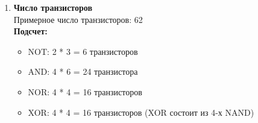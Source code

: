 \documentclass[12pt, a4paper]{article}
\begin{document}
\begin{enumerate}[label=\arabic*., leftmargin=*, widest=9]
    \item \textbf{Число транзисторов} \\
    Примерное число транзисторов: 62 \\
    \textbf{Подсчет:}
    \begin{itemize}
        \item NOT: 2 * 3 = 6 транзисторов
        \item AND: 4 * 6 = 24 транзистора
        \item NOR: 4 * 4 = 16 транзисторов
        \item XOR: 4 * 4 = 16 транзисторов (XOR состоит из 4-х NAND)
    \end{itemize}
\end{enumerate}
\end{document}
